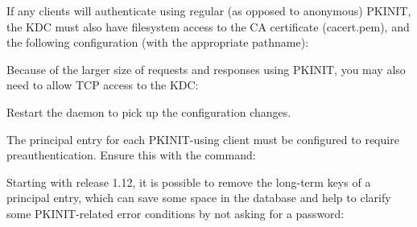 \documentclass[letterpaper,10pt,english]{sphinxmanual}
\begin{document}
If any clients will authenticate using regular (as opposed to
anonymous) PKINIT, the KDC must also have filesystem access to the CA
certificate (cacert.pem), and the following configuration (with the
appropriate pathname):

%
\begin{sphinxVerbatim}[commandchars=\\\{\}]
  
\end{sphinxVerbatim}

Because of the larger size of requests and responses using PKINIT, you
may also need to allow TCP access to the KDC:

%
\begin{sphinxVerbatim}[commandchars=\\\{\}]
  
\end{sphinxVerbatim}

Restart the {\hyperref[\detokenize{admin/admin_commands/krb5kdc:krb5kdc-8}]{}} daemon to pick up the configuration
changes.

The principal entry for each PKINIT-using client must be configured to
require preauthentication.  Ensure this with the command:

%
\begin{sphinxVerbatim}[commandchars=\\\{\}]
  
\end{sphinxVerbatim}

Starting with release 1.12, it is possible to remove the long-term
keys of a principal entry, which can save some space in the database
and help to clarify some PKINIT-related error conditions by not asking
for a password:

%
\begin{sphinxVerbatim}[commandchars=\\\{\}]
  
\end{sphinxVerbatim}
\end{document}
